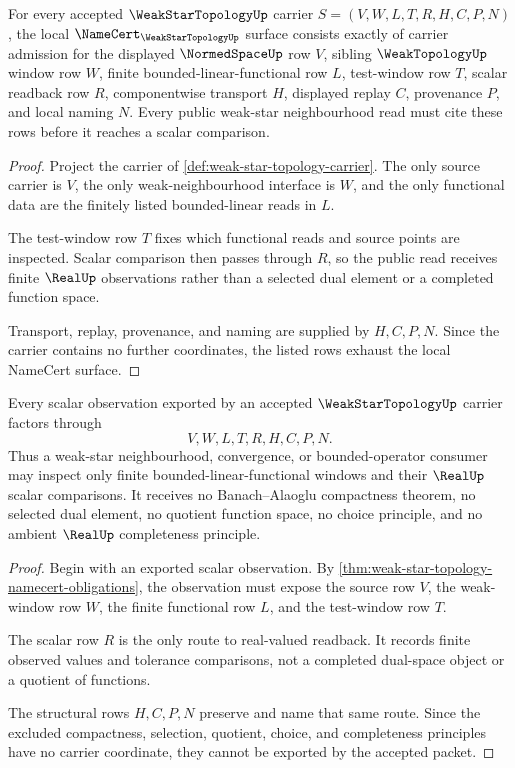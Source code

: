 \begin{theorem}
\label{thm:weak-star-topology-namecert-obligations}
For every accepted $\WeakStarTopologyUp$ carrier $S=(V,W,L,T,R,H,C,P,N)$, the local $\NameCert_{\WeakStarTopologyUp}$ surface consists exactly of carrier admission for the displayed $\NormedSpaceUp$ row $V$, sibling $\WeakTopologyUp$ window row $W$, finite bounded-linear-functional row $L$, test-window row $T$, scalar readback row $R$, componentwise transport $H$, displayed replay $C$, provenance $P$, and local naming $N$. Every public weak-star neighbourhood read must cite these rows before it reaches a scalar comparison.
\end{theorem}
\begin{proof}
Project the carrier of \autoref{def:weak-star-topology-carrier}. The only source carrier is $V$, the only weak-neighbourhood interface is $W$, and the only functional data are the finitely listed bounded-linear reads in $L$.

The test-window row $T$ fixes which functional reads and source points are inspected. Scalar comparison then passes through $R$, so the public read receives finite $\RealUp$ observations rather than a selected dual element or a completed function space.

Transport, replay, provenance, and naming are supplied by $H,C,P,N$. Since the carrier contains no further coordinates, the listed rows exhaust the local NameCert surface.
\end{proof}

\begin{theorem}
\label{thm:weak-star-topology-finite-window-nonescape}
Every scalar observation exported by an accepted $\WeakStarTopologyUp$ carrier factors through
$$
V,W,L,T,R,H,C,P,N .
$$
Thus a weak-star neighbourhood, convergence, or bounded-operator consumer may inspect only finite bounded-linear-functional windows and their $\RealUp$ scalar comparisons. It receives no Banach--Alaoglu compactness theorem, no selected dual element, no quotient function space, no choice principle, and no ambient $\RealUp$ completeness principle.
\end{theorem}
\begin{proof}
Begin with an exported scalar observation. By \autoref{thm:weak-star-topology-namecert-obligations}, the observation must expose the source row $V$, the weak-window row $W$, the finite functional row $L$, and the test-window row $T$.

The scalar row $R$ is the only route to real-valued readback. It records finite observed values and tolerance comparisons, not a completed dual-space object or a quotient of functions.

The structural rows $H,C,P,N$ preserve and name that same route. Since the excluded compactness, selection, quotient, choice, and completeness principles have no carrier coordinate, they cannot be exported by the accepted packet.
\end{proof}

